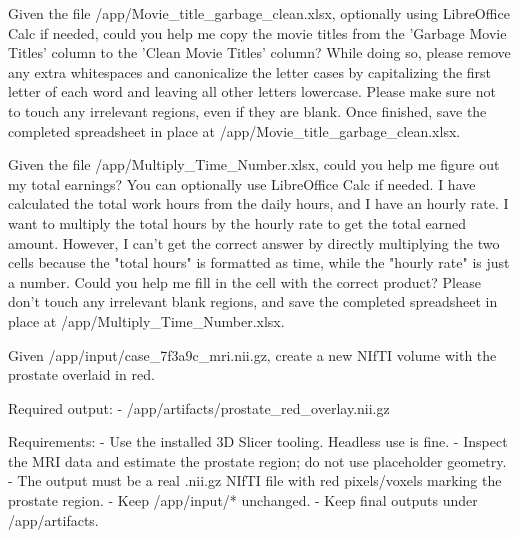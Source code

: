 \documentclass{llmxive}
\begin{document}
\begin{instructionbox}
Given the file \textasciigrave{}/app/Movie\_title\_garbage\_clean.xlsx\textasciigrave{}, optionally using LibreOffice Calc if needed, could you help me copy the movie titles from the 'Garbage Movie Titles' column to the 'Clean Movie Titles' column? While doing so, please remove any extra whitespaces and canonicalize the letter cases by capitalizing the first letter of each word and leaving all other letters lowercase. Please make sure not to touch any irrelevant regions, even if they are blank. Once finished, save the completed spreadsheet in place at \textasciigrave{}/app/Movie\_title\_garbage\_clean.xlsx\textasciigrave{}.
\end{instructionbox}

\begin{instructionbox}
Given the file \textasciigrave{}/app/Multiply\_Time\_Number.xlsx\textasciigrave{}, could you help me figure out my total earnings? You can optionally use LibreOffice Calc if needed. I have calculated the total work hours from the daily hours, and I have an hourly rate. I want to multiply the total hours by the hourly rate to get the total earned amount. However, I can't get the correct answer by directly multiplying the two cells because the "total hours" is formatted as time, while the "hourly rate" is just a number. Could you help me fill in the cell with the correct product? Please don't touch any irrelevant blank regions, and save the completed spreadsheet in place at \textasciigrave{}/app/Multiply\_Time\_Number.xlsx\textasciigrave{}.
\end{instructionbox}

\begin{instructionbox}
Given \textasciigrave{}/app/input/case\_7f3a9c\_mri.nii.gz\textasciigrave{}, create a new NIfTI volume with the prostate overlaid in red.

Required output:
- \textasciigrave{}/app/artifacts/prostate\_red\_overlay.nii.gz\textasciigrave{}

Requirements:
- Use the installed 3D Slicer tooling. Headless use is fine.
- Inspect the MRI data and estimate the prostate region; do not use placeholder geometry.
- The output must be a real \textasciigrave{}.nii.gz\textasciigrave{} NIfTI file with red pixels/voxels marking the prostate region.
- Keep \textasciigrave{}/app/input/*\textasciigrave{} unchanged.
- Keep final outputs under \textasciigrave{}/app/artifacts\textasciigrave{}.
\end{instructionbox}
\end{document}
